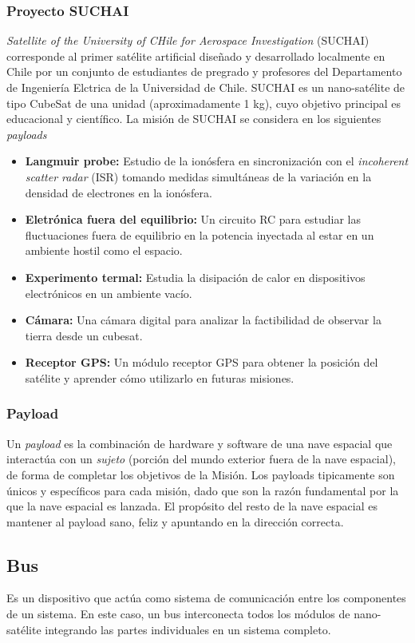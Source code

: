 \documentclass[11pt,letterpaper]{article}
\begin{document}
\subsubsection{Proyecto SUCHAI}
  \textit{Satellite of the University of CHile for Aerospace Investigation} (SUCHAI) corresponde al primer sat\'elite artificial diseñado y desarrollado localmente en Chile por un conjunto de estudiantes de pregrado y profesores del Departamento de Ingeniería Elctrica de la Universidad de Chile.
SUCHAI es un nano-sat\'elite de tipo CubeSat de una unidad (aproximadamente 1 kg), cuyo objetivo principal es educacional y científico.
La misión de SUCHAI se considera en los siguientes \textit{payloads}
\begin{itemize}
\item \textbf{Langmuir probe: } Estudio de la ionósfera en sincronización con el \textit{incoherent scatter radar} (ISR) tomando medidas simultáneas de la variación en la densidad de electrones en la ionósfera.
\item \textbf{Eletrónica fuera del equilibrio: } Un circuito RC para estudiar las fluctuaciones fuera de equilibrio en la potencia inyectada al estar en un ambiente hostil como el espacio.
\item \textbf{Experimento termal: } Estudia la disipación de calor en dispositivos electrónicos en un ambiente vacío.
\item \textbf{Cámara: } Una cámara digital para analizar la factibilidad de observar la tierra desde un cubesat.
\item \textbf{Receptor GPS: } Un módulo receptor GPS para obtener la posición del sat\'elite y aprender cómo utilizarlo en futuras misiones.
\end{itemize}

\subsubsection{Payload}
Un \textit{payload} es la combinación de hardware y software de una nave espacial que interactúa con un \textit{sujeto} (porción del mundo exterior fuera de la nave espacial), de forma de completar los objetivos de la Misión. Los payloads tipicamente son únicos y específicos para cada misión, dado que son la razón fundamental por la que la nave espacial es lanzada. El propósito del resto de la nave espacial es mantener al payload sano, feliz y apuntando en la dirección correcta.
\subsection{Bus}
Es un dispositivo que actúa como sistema de comunicación entre los componentes de un sistema. En este caso, un bus interconecta todos los módulos de nano-sat\'elite integrando las partes individuales en un sistema completo.
\end{document}

